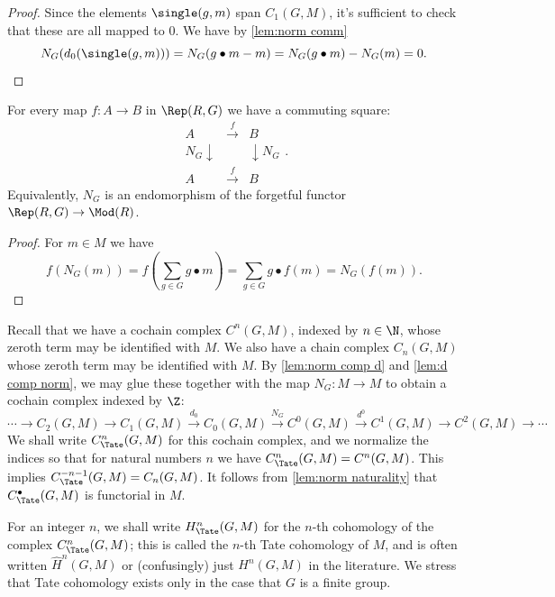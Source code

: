 \begin{proof}
	\leanok
	Since the elements $\single(g,m)$ span $C_1(G,M)$, it's sufficient to check
	that these are all mapped to $0$.
	We have by \ref{lem:norm comm}
	\[
		N_G(d_0 (\single(g,m)))
		= N_G( g \bullet m - m)
		=	N_G( g \bullet m) - N_G(m)
		= 0.
	\]
\end{proof}

\begin{lemma} \label{lem:norm naturality}
	\leanok
	\mathlibok
	For every map $f : A \to B$ in $\Rep(R,G)$ we have a commuting square:
	\[
		\begin{array}{rcl}
			A & \stackrel{f}\to & B \\[2mm]
			N_G\downarrow && \downarrow N_G \\
			A & \stackrel{f}\to & B
		\end{array} .
	\]
	Equivalently, $N_G$ is an endomorphism of the forgetful functor $\Rep(R,G) \to \Mod(R)$.
\end{lemma}

\begin{proof}
	\leanok
	For $m \in M$ we have
	\[
		f(N_G (m))
		= f\left( \sum_{g \in G} g \bullet m\right)
		= \sum_{g \in G} g \bullet f(m)
		= N_G(f(m)).
	\]
\end{proof}

\begin{definition} \label{def:Tate cohomology}
	\leanok
	\mathlibok
	Recall that we have a cochain complex $C^n(G,M)$, indexed by $n \in \N$,
	whose zeroth term may be identified with $M$.
	We also have a chain complex $C_n(G,M)$ whose zeroth term may be identified with $M$.
	By \ref{lem:norm comp d} and \ref{lem:d comp norm}, we may glue these
	together with the map $N_G : M \to M$ to obtain	a cochain complex indexed by $\Z$:
	\[
		\cdots \to C_2(G,M) \to C_1(G,M) \stackrel{d_0}\to C_0(G,M)
		\stackrel{N_G}\to C^0(G,M) \stackrel{d^0}\to C^1(G,M) \to C^2(G,M) \to \cdots
	\]
	We shall write $C^n_{\Tate}(G,M)$ for this cochain complex,
	and we normalize the indices so that for
	natural numbers $n$ we have $C^n_{\Tate}(G,M) = C^n(G,M)$. This implies
	$C^{-n-1}_{\Tate}(G,M) = C_n(G,M)$.
	It follows from \ref{lem:norm naturality}
	that $C^\bullet_{\Tate}(G,M)$ is functorial in $M$.

	For an integer $n$, we shall write $H^n_{\Tate}(G,M)$ for the $n$-th cohomology of the complex
	$C^n_{\Tate}(G,M)$; this is called the $n$-th Tate cohomology of $M$,
	and is often written $\hat H^n(G,M)$ or (confusingly) just $H^n(G,M)$ in the literature.
	We stress that Tate cohomology exists only in the case that $G$ is a finite group.
\end{definition}

